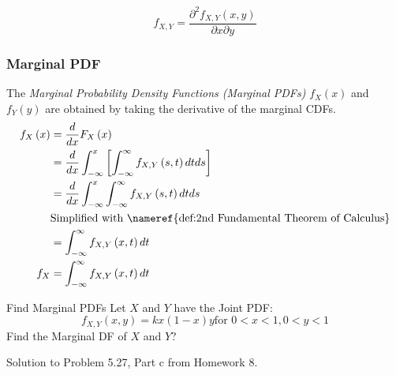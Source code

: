 \begin{propertylist}[resume]
\item
  \begin{equation}
    f_{X,Y} = \frac{\partial^{2} f_{X,Y} \left( x,y \right)}{\partial x \partial y}
  \end{equation}
\end{propertylist}

\subsubsection{Marginal PDF}\label{subsubsec:Marginal PDF}
\begin{definition}\label{def:Marginal PDF}
  The \emph{Marginal Probability Density Functions (Marginal PDFs)} $f_{X} \left( x \right)$ and $f_{Y} \left( y \right)$ are obtained by taking the derivative of the marginal CDFs.
  \begin{equation}
    \begin{aligned}
      f_{X} \left( x \right) &= \frac{d}{dx} F_{X} \left( x \right) \\
      &= \frac{d}{dx} \int_{-\infty}^{x} \left[ \int_{-\infty}^{\infty} f_{X,Y} \left( s,t \right) dt ds \right] \\
      &= \frac{d}{dx} \int_{-\infty}^{x} \int_{-\infty}^{\infty} f_{X,Y} \left( s,t \right) dt ds \\
      &\text{Simplified with \nameref{def:2nd Fundamental Theorem of Calculus}} \\
      &= \int_{-\infty}^{\infty} f_{X,Y} \left( x,t \right) dt \\
      f_{X} &= \int_{-\infty}^{\infty} f_{X,Y} \left( x,t \right) dt \\
    \end{aligned}
  \end{equation}
\end{definition}
\begin{example}[Problem 5.27]{Find Marginal PDFs}
  Let $X$ and $Y$ have the Joint PDF:
  \begin{equation*}
    f_{X,Y} \left( x,y \right) = k x \left( 1-x \right) y \text{for } 0<x<1, 0<y<1
  \end{equation*}
  Find the Marginal DF of $X$ and $Y$?

  \tcblower

  Solution to Problem 5.27, Part c from Homework 8.
\end{example}

